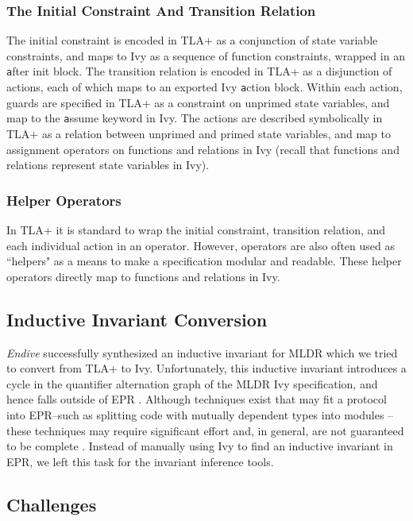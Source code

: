 \documentclass[runningheads]{llncs}
\newcommand{\ivy}[1]{{\small\texttt #1}}
\begin{document}
\subsubsection{The Initial Constraint And Transition Relation}

The initial constraint is encoded in TLA+ as a conjunction of state variable constraints, and maps to Ivy as a sequence of function constraints, wrapped in an \ivy{after init} block.  The transition relation is encoded in TLA+ as a disjunction of actions, each of which maps to an exported Ivy \ivy{action} block.  Within each action, guards are specified in TLA+ as a constraint on unprimed state variables, and map to the \ivy{assume} keyword in Ivy.  The actions are described symbolically in TLA+ as a relation between unprimed and primed state variables, and map to assignment operators on functions and relations in Ivy (recall that functions and relations represent state variables in Ivy).

\subsubsection{Helper Operators}

In TLA+ it is standard to wrap the initial constraint, transition relation, and each individual action in an operator.  However, operators are also often used as ``helpers" as a means to make a specification modular and readable.  These helper operators directly map to functions and relations in Ivy.

\subsection{Inductive Invariant Conversion}
\label{subsec:indinv-conv}

\textit{Endive} successfully synthesized an inductive invariant for MLDR which we tried to convert from TLA+ to Ivy.  Unfortunately, this inductive invariant introduces a cycle in the quantifier alternation graph of the MLDR Ivy specification, and hence falls outside of EPR \cite{padonpaxosEPR}.  Although techniques exist that may fit a protocol into EPR--such as splitting code with mutually dependent types into modules \cite{McMillan2018DeductiveVI}--these techniques may require significant effort and, in general, are not guaranteed to be complete \cite{padonpaxosEPR}.  Instead of manually using Ivy to find an inductive invariant in EPR, we left this task for the invariant inference tools.

\subsection{Challenges}
\end{document}
